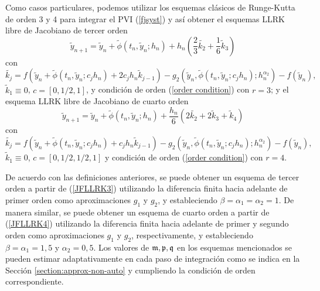 Como casos particulares, podemos utilizar los esquemas clásicos de Runge-Kutta de orden 3 y 4 para integrar el PVI (\ref{fjsyst}) y así obtener el esquemas LLRK libre de Jacobiano de tercer orden
\begin{equation}
    \widetilde{y}_{n+1}=\widetilde{y}_n+\widetilde{\phi}(t_n,\widetilde{y}_n;h_n) + h_n(\frac{2}{3}\widetilde{k_2}+\frac{1}{6}\widetilde{k}_3) \label{JFLLRK3}
\end{equation}
con
\begin{equation*}
    \widetilde{k_j}=f(\widetilde{y}_n+\widetilde{\phi}(t_n,\widetilde{y}_n;c_jh_n)+2c_jh_n\widetilde{k}_{j-1})-g_2(\widetilde{y}_n,\widetilde{\phi}(t_n,\widetilde{y}_n;c_jh_n);h^{\alpha_2}_n)-f(\widetilde{y}_n),
\end{equation*}
$\widetilde{k}_1\equiv 0$, $c=[0,1/2,1]$, y condición de orden  (\ref{order condition}) con $r=3$; y el esquema LLRK libre de Jacobiano de cuarto orden
\begin{equation}
    \widetilde{y}_{n+1}=\widetilde{y}_n+\widetilde{\phi}(t_n,\widetilde{y}_n;h_n) + \frac{h_n}{6}(2\widetilde{k_2}+2\widetilde{k}_3+\widetilde{k}_4) \label{JFLLRK4}
\end{equation}
con
\begin{equation*}
    \widetilde{k_j}=f(\widetilde{y}_n+\widetilde{\phi}(t_n,\widetilde{y}_n;c_jh_n)+c_jh_n\widetilde{k}_{j-1})-g_2(\widetilde{y}_n,\widetilde{\phi}(t_n,\widetilde{y}_n;c_jh_n);h^{\alpha_2}_n)-f(\widetilde{y}_n),
\end{equation*}
$\widetilde{k}_1\equiv 0$, $c=[0,1/2,1/2,1]$ y condición de orden  (\ref{order condition}) con $r=4$.

De acuerdo con las definiciones anteriores, se puede obtener un esquema de tercer orden a partir de (\ref{JFLLRK3}) utilizando la diferencia finita hacia adelante de primer orden como aproximaciones $g_1$ y $g_2$, y estableciendo $\beta=\alpha_1 =\alpha_2=1$. De manera similar, se puede obtener un esquema de cuarto orden a partir de (\ref{JFLLRK4}) utilizando la diferencia finita hacia adelante de primer y segundo orden como aproximaciones $g_1$ y $g_2$, respectivamente, y estableciendo $\beta= \alpha_1=1,5$ y $\alpha_2=0,5$. Los valores de $\mathfrak{m},\mathfrak{p},\mathfrak{q}$ en los esquemas mencionados se pueden estimar adaptativamente en cada paso de integración como se indica en la Sección \ref{section:approx-non-auto} y cumpliendo la condición de orden correspondiente.

